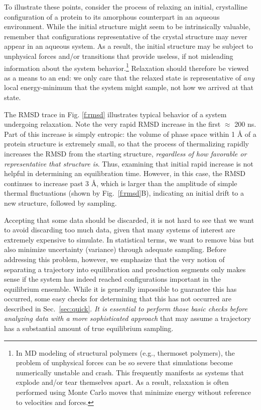 To illustrate these points, consider the process of relaxing an initial, crystalline configuration of a protein to its amorphous counterpart in an aqueous environment.
While the initial structure might seem to be intrinsically valuable, remember that configurations representative of the crystal structure may never appear in an aqueous system.
As a result, the initial structure may be subject to unphysical forces and/or transitions that provide useless, if not misleading information about the system behavior.\footnote{In MD modeling of structural polymers (e.g., thermoset polymers), the problem of unphysical forces can be so severe that simulations become numerically unstable and crash.  This frequently manifests as systems that explode and/or tear themselves apart.  As a result, relaxation is often performed using Monte Carlo moves that minimize energy without reference to velocities and forces.}
Relaxation should therefore be viewed as a means to an end: we only care that the relaxed state is representative of {\it any} local energy-minimum that the system might sample, not how we arrived at that state.

The RMSD trace in Fig. \ref{f:rmsd} illustrates typical behavior of a system undergoing relaxation.  Note the very rapid RMSD increase in the first $\approx$ 200 ns. Part of this increase is simply entropic: the volume of phase space within 1 {\AA} of a protein structure is extremely small, so that the process of thermalizing rapidly increases the RMSD from the starting structure, \emph{regardless of how favorable or representative that structure is}.  Thus, examining that initial rapid increase is not helpful in determining an equilibration time.  However, in this case, the RMSD continues to increase past 3 {\AA}, which is larger than the amplitude of simple thermal fluctuations (shown by Fig.\ \ref{f:rmsd}B), indicating an initial drift to a new structure, followed by sampling.

Accepting that some data should be discarded, it is not hard to see that we want to avoid discarding too much data, given that many systems of interest are extremely expensive to simulate.  In statistical terms, we want to remove bias but also minimize uncertainty (variance) through adequate sampling.  Before addressing this problem, however, we emphasize that the very notion of separating a trajectory into equilibration and production segments only makes sense if the system has indeed reached configurations important in the equilibrium ensemble. While it is generally impossible to guarantee this has occurred, some easy checks for determining that this has not occurred are described in Sec.\ \ref{sec:quick}. \emph{It is essential to perform those basic checks before analyzing data with a more sophisticated approach} that may assume a trajectory has a substantial amount of true equilibrium sampling.

